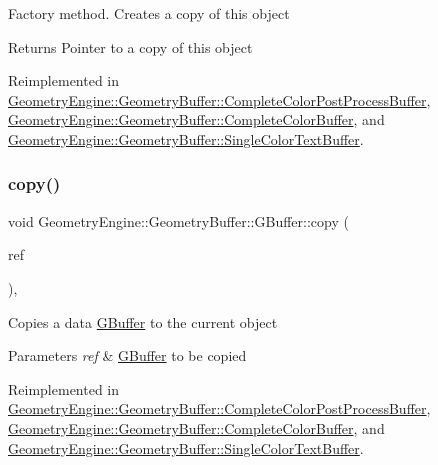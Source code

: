 Factory method. Creates a copy of this object \begin{DoxyReturn}{Returns}
Pointer to a copy of this object 
\end{DoxyReturn}


Reimplemented in \mbox{\hyperlink{class_geometry_engine_1_1_geometry_buffer_1_1_complete_color_post_process_buffer_a8a484d5196bba7b92f31e500229743bc}{Geometry\+Engine\+::\+Geometry\+Buffer\+::\+Complete\+Color\+Post\+Process\+Buffer}}, \mbox{\hyperlink{class_geometry_engine_1_1_geometry_buffer_1_1_complete_color_buffer_a56aee74c7523f0b16fd8b97c8c44f84f}{Geometry\+Engine\+::\+Geometry\+Buffer\+::\+Complete\+Color\+Buffer}}, and \mbox{\hyperlink{class_geometry_engine_1_1_geometry_buffer_1_1_single_color_text_buffer_add00c2857f9d425600ef83d50a9c8019}{Geometry\+Engine\+::\+Geometry\+Buffer\+::\+Single\+Color\+Text\+Buffer}}.

\mbox{\label{class_geometry_engine_1_1_geometry_buffer_1_1_g_buffer_a9f20eb78703ef048d59a54f90ee09f25}} 
\subsubsection{\texorpdfstring{copy()}{copy()}}
{\footnotesize\ttfamily void Geometry\+Engine\+::\+Geometry\+Buffer\+::\+G\+Buffer\+::copy (\begin{DoxyParamCaption}\item[{const \mbox{\hyperlink{class_geometry_engine_1_1_geometry_buffer_1_1_g_buffer}{G\+Buffer}} \&}]{ref }\end{DoxyParamCaption})\hspace{0.3cm}{\ttfamily [protected]}, {\ttfamily [virtual]}}

Copies a data \mbox{\hyperlink{class_geometry_engine_1_1_geometry_buffer_1_1_g_buffer}{G\+Buffer}} to the current object 
\begin{DoxyParams}{Parameters}
{\em ref} & \mbox{\hyperlink{class_geometry_engine_1_1_geometry_buffer_1_1_g_buffer}{G\+Buffer}} to be copied \\
\hline
\end{DoxyParams}


Reimplemented in \mbox{\hyperlink{class_geometry_engine_1_1_geometry_buffer_1_1_complete_color_post_process_buffer_ac7d1a90658b1a2f59674b76685e8b052}{Geometry\+Engine\+::\+Geometry\+Buffer\+::\+Complete\+Color\+Post\+Process\+Buffer}}, \mbox{\hyperlink{class_geometry_engine_1_1_geometry_buffer_1_1_complete_color_buffer_a0630be352a9267083d42802fb22ae36b}{Geometry\+Engine\+::\+Geometry\+Buffer\+::\+Complete\+Color\+Buffer}}, and \mbox{\hyperlink{class_geometry_engine_1_1_geometry_buffer_1_1_single_color_text_buffer_a6e266272638dd67cec7b6d57f172eae2}{Geometry\+Engine\+::\+Geometry\+Buffer\+::\+Single\+Color\+Text\+Buffer}}.

